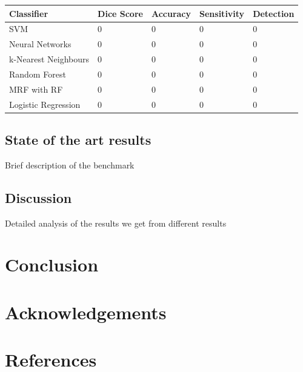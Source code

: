 \documentclass{article} %
\begin{document}
\begin{center}
\centering
\begin{tabular}{ | m{7em} | m{2cm}| m{2cm} | m{2cm} | m{2cm} | } 
\hline
\textbf{Classifier} & \textbf{Dice Score} & \textbf{Accuracy} & \textbf{Sensitivity} & \textbf{Detection}\\ 
\hline
SVM & 0 & 0 & 0 & 0  \\ 
\hline
Neural Networks & 0 & 0 & 0 & 0 \\ 
\hline
k-Nearest Neighbours & 0 & 0 & 0 & 0 \\ 
\hline
Random Forest & 0 & 0 & 0 & 0 \\ 
\hline
MRF with RF & 0 & 0 & 0 & 0 \\ 
\hline
Logistic Regression & 0 & 0 & 0 & 0 \\ 
\hline
\end{tabular}
\end{center}

\subsection{State of the art results}
Brief description of the benchmark

\subsection{Discussion}
Detailed analysis of the results we get from different results

\section{Conclusion}



\section{Acknowledgements}

\section{References}



\end{document}
